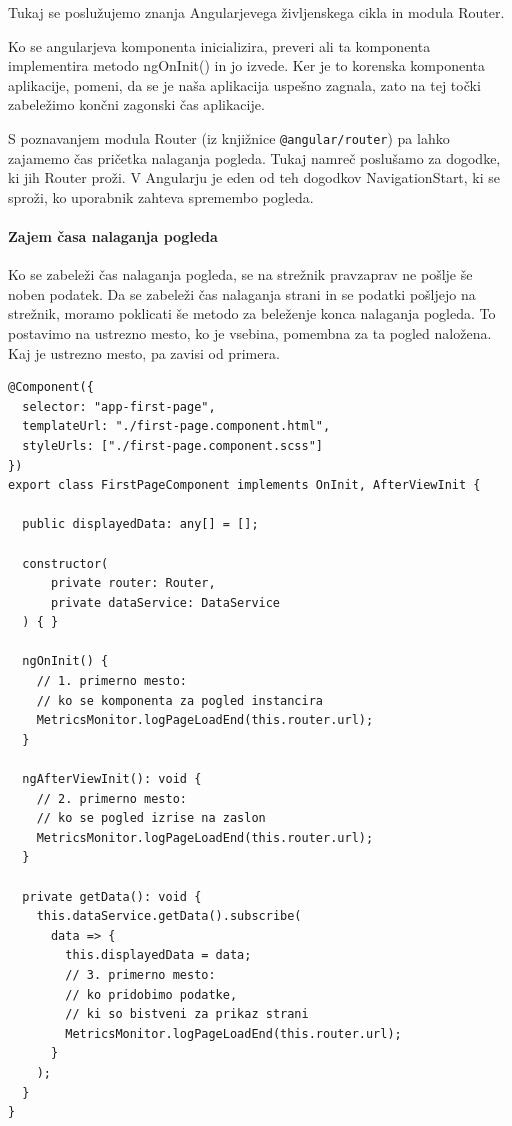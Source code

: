 \documentclass[a4paper, 12pt]{book}
\begin{document}
Tukaj se poslužujemo znanja Angularjevega življenskega cikla in modula Router.

Ko se angularjeva komponenta inicializira, preveri ali ta komponenta implementira metodo ngOnInit() in jo izvede. Ker je to korenska komponenta aplikacije, pomeni, da se je naša aplikacija uspešno zagnala, zato na tej točki zabeležimo končni zagonski čas aplikacije.

S poznavanjem modula Router (iz knjižnice \verb|@angular/router|) pa lahko zajamemo čas pričetka nalaganja pogleda. Tukaj namreč poslušamo za dogodke, ki jih Router proži. V Angularju je eden od teh dogodkov NavigationStart, ki se sproži, ko uporabnik zahteva spremembo pogleda.

\paragraph{Zajem časa nalaganja pogleda}

Ko se zabeleži čas nalaganja pogleda, se na strežnik pravzaprav ne pošlje še noben podatek. Da se zabeleži čas nalaganja strani in se podatki pošljejo na strežnik, moramo poklicati še metodo za beleženje konca nalaganja pogleda. To postavimo na ustrezno mesto, ko je vsebina, pomembna za ta pogled naložena. Kaj je ustrezno mesto, pa zavisi od primera.

\begin{lstlisting}[label=code:lib_page_comp, caption=Zajem časa nalaganja pogleda]
@Component({
  selector: "app-first-page",
  templateUrl: "./first-page.component.html",
  styleUrls: ["./first-page.component.scss"]
})
export class FirstPageComponent implements OnInit, AfterViewInit {

  public displayedData: any[] = [];

  constructor(
      private router: Router,
      private dataService: DataService
  ) { }

  ngOnInit() {
    // 1. primerno mesto:
    // ko se komponenta za pogled instancira
    MetricsMonitor.logPageLoadEnd(this.router.url);
  }

  ngAfterViewInit(): void {
    // 2. primerno mesto:
    // ko se pogled izrise na zaslon
    MetricsMonitor.logPageLoadEnd(this.router.url);
  }

  private getData(): void {
    this.dataService.getData().subscribe(
      data => {
        this.displayedData = data;
        // 3. primerno mesto:
        // ko pridobimo podatke,
        // ki so bistveni za prikaz strani
        MetricsMonitor.logPageLoadEnd(this.router.url);
      }
    );
  }
}
\end{lstlisting}
\end{document}
